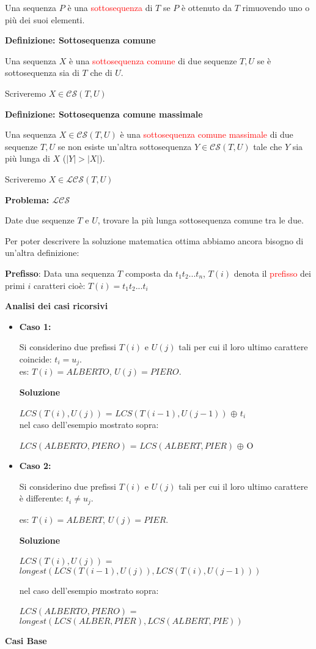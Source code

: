 \documentclass[../cheatSheetAlgoritmi.tex]{subfiles}
\begin{document}
Una sequenza $P$ è una \textcolor{red}{sottosequenza} di $T$ se $P$ è ottenuto da $T$ rimuovendo uno o più dei suoi elementi.

\bigskip

\textbf{Definizione: Sottosequenza comune}

Una sequenza $X$ è una \textcolor{red}{sottosequenza comune} di due sequenze $T, U$ se è sottosequenza sia di $T$ che di $U$.

Scriveremo $X \in \mathcal{CS}(T, U)$

\bigskip

\textbf{Definizione: Sottosequenza comune massimale}

Una sequenza $X \in \mathcal{CS}(T, U)$ è una \textcolor{red}{sottosequenza comune massimale} di due sequenze $T, U$ se non esiste un'altra sottosequenza $Y \in \mathcal{CS}(T, U)$ tale che $Y$ sia più lunga di $X$  ($|Y| > |X|$).

Scriveremo $X \in \mathcal{LCS}(T, U)$

\bigskip

\textbf{Problema: $\mathcal{LCS}$}

Date due sequenze $T$ e $U$, trovare la più lunga sottosequenza comune tra le due.

\bigskip

Per poter descrivere la soluzione matematica ottima abbiamo ancora bisogno di un'altra definizione:

\textbf{Prefisso}: Data una sequenza $T$ composta da $t_{1}t_{2}...t_{n}$, $T(i)$ denota il \textcolor{red}{prefisso} dei primi $i$ caratteri cioè: $T(i) = t_{1}t_{2}...t_{i}$

\bigskip

\textbf{Analisi dei casi ricorsivi}
\begin{itemize}
	\item \textbf{Caso 1:}
	
Si considerino due prefissi $T(i)$ e $U(j)$ tali per cui il loro ultimo carattere coincide: $t_{i} = u_{j}$.\\
es: $T(i) = ALBERTO$, $U(j) = PIERO$.

\textbf{Soluzione}

$LCS(T(i), U(j))$ = $LCS(T(i-1), U(j-1))$ $\oplus$ $t_{i}$\\
nel caso dell'esempio mostrato sopra:

$LCS(ALBERTO, PIERO)$ = $LCS(ALBERT, PIER)$ $\oplus$ O
	\item \textbf{Caso 2:}
	
Si considerino due prefissi $T(i)$ e $U(j)$ tali per cui il loro ultimo carattere è differente: $t_{i} \neq u_{j}$.

es: $T(i) = ALBERT$, $U(j) = PIER$.

\textbf{Soluzione}

$LCS(T(i), U(j))$ = $longest(LCS(T(i-1), U(j)), LCS(T(i), U(j-1)))$

nel caso dell'esempio mostrato sopra:

$LCS(ALBERTO, PIERO)$ = $longest (LCS(ALBER, PIER), LCS(ALBERT, PIE))$

\end{itemize}
\textbf{Casi Base}
\end{document}
